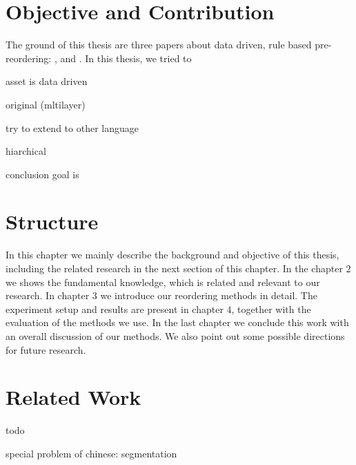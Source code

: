 \section{Objective and Contribution}
\label{ch:Introduction:sec:ObjectiveAndContribution}

The ground of this thesis are three papers about data driven, rule based pre-reordering: \cite{short}, \cite{long} and \cite{tree}. In this thesis, we tried to 

asset is data driven

original (mltilayer)

try to extend to other language

hiarchical \cite{hier}

conclusion goal is

\section{Structure}
\label{ch:Introduction:sec:Structure}

In this chapter we mainly describe the background and objective of this thesis, including the related research in the next section of this chapter. In the chapter $2$ we shows the fundamental knowledge, which is related and relevant to our research. In chapter $3$ we introduce our reordering methods in detail. The experiment setup and results are present in chapter $4$, together with the evaluation of the methods we use. In the last chapter we conclude this work with an overall discussion of our methods. We also point out some possible directions for future research.

\section{Related Work}
\label{ch:Introduction:sec:RelatedWork}

todo

special problem of chinese: segmentation